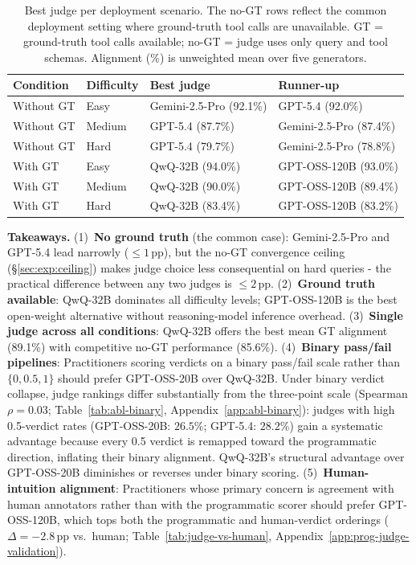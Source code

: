 \begin{table}[!htbp]
\centering
\small
\setlength{\tabcolsep}{5pt}
\renewcommand{\arraystretch}{1.2}
\caption{Best judge per deployment scenario. The no-GT rows reflect the common deployment setting where ground-truth tool calls are unavailable. GT = ground-truth tool calls available; no-GT = judge uses only query and tool schemas. Alignment (\%) is unweighted mean over five generators.}
\label{tab:decision-guide}
\begin{tabularx}{0.82\textwidth}{@{}llXX@{}}
\toprule
\textbf{Condition} & \textbf{Difficulty} & \textbf{Best judge} & \textbf{Runner-up} \\
\midrule
Without GT & Easy   & Gemini-2.5-Pro (92.1\%) & GPT-5.4 (92.0\%)      \\
Without GT & Medium & GPT-5.4 (87.7\%)        & Gemini-2.5-Pro (87.4\%) \\
Without GT & Hard   & GPT-5.4 (79.7\%)        & Gemini-2.5-Pro (78.8\%) \\
\midrule
With GT    & Easy   & QwQ-32B (94.0\%)        & GPT-OSS-120B (93.0\%) \\
With GT    & Medium & QwQ-32B (90.0\%)        & GPT-OSS-120B (89.4\%) \\
With GT    & Hard   & QwQ-32B (83.4\%)        & GPT-OSS-120B (83.2\%) \\
\bottomrule
\end{tabularx}
\end{table}

\textbf{Takeaways.} (1)~\textbf{No ground truth} (the common case): Gemini-2.5-Pro and GPT-5.4 lead narrowly ($\leq 1$\,pp), but the no-GT convergence ceiling (\S\ref{sec:exp:ceiling}) makes judge choice less consequential on hard queries - the practical difference between any two judges is $\leq 2$\,pp. (2)~\textbf{Ground truth available}: QwQ-32B dominates all difficulty levels; GPT-OSS-120B is the best open-weight alternative without reasoning-model inference overhead. (3)~\textbf{Single judge across all conditions}: QwQ-32B offers the best mean GT alignment (89.1\%) with competitive no-GT performance (85.6\%). (4)~\textbf{Binary pass/fail pipelines}: Practitioners scoring verdicts on a binary pass/fail scale rather than $\{0, 0.5, 1\}$ should prefer GPT-OSS-20B over QwQ-32B. Under binary verdict collapse, judge rankings differ substantially from the three-point scale (Spearman $\rho = 0.03$; Table~\ref{tab:abl-binary}, Appendix~\ref{app:abl-binary}): judges with high 0.5-verdict rates (GPT-OSS-20B: $26.5\%$; GPT-5.4: $28.2\%$) gain a systematic advantage because every 0.5 verdict is remapped toward the programmatic direction, inflating their binary alignment. QwQ-32B's structural advantage over GPT-OSS-20B diminishes or reverses under binary scoring. (5)~\textbf{Human-intuition alignment}: Practitioners whose primary concern is agreement with human annotators rather than with the programmatic scorer should prefer GPT-OSS-120B, which tops both the programmatic and human-verdict orderings ($\Delta = -2.8$\,pp vs.\ human; Table~\ref{tab:judge-vs-human}, Appendix~\ref{app:prog-judge-validation}).

